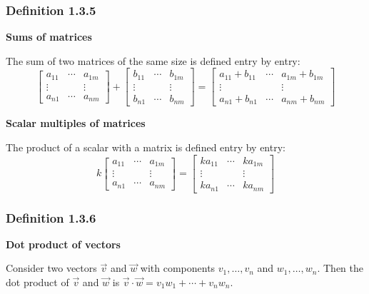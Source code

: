 \documentclass{report}
\begin{document}
\subsubsection*{Definition 1.3.5}
\par\noindent\textbf{Sums of matrices}
\par\noindent The sum of two matrices of the same size is defined entry by entry:
\[\left[\begin{array}{ccc}a_{11} & \cdots & a_{1m}\\ \vdots & & \vdots\\ a_{n1} & \cdots & a_{nm}\end{array}\right]+\left[\begin{array}{ccc}b_{11} & \cdots & b_{1m}\\ \vdots & & \vdots\\ b_{n1} & \cdots & b_{nm}\end{array}\right]=\left[\begin{array}{ccc}a_{11}+b_{11} & \cdots & a_{1m}+b_{1m}\\ \vdots & & \vdots\\ a_{n1}+b_{n1} & \cdots & a_{nm}+b_{nm}\end{array}\right]\]
\par\noindent\textbf{Scalar multiples of matrices}
\par\noindent The product of a scalar with a matrix is defined entry by entry:
\[k\left[\begin{array}{ccc}a_{11} & \cdots & a_{1m}\\ \vdots & & \vdots\\ a_{n1} & \cdots & a_{nm}\end{array}\right]=\left[\begin{array}{ccc}ka_{11} & \cdots & ka_{1m}\\ \vdots & & \vdots\\ ka_{n1} & \cdots & ka_{nm}\end{array}\right]\]
\subsubsection*{Definition 1.3.6}
\par\noindent\textbf{Dot product of vectors}
\par\noindent Consider two vectors $\vec{v}$ and $\vec{w}$ with components $v_{1},\ldots{},v_{n}$ and $w_{1},\ldots{},w_{n}$. Then the dot product of $\vec{v}$ and $\vec{w}$ is $\vec{v}\cdot\vec{w}=v_{1}w_{1}+\cdots{}+v_{n}w_{n}$.
\end{document}
